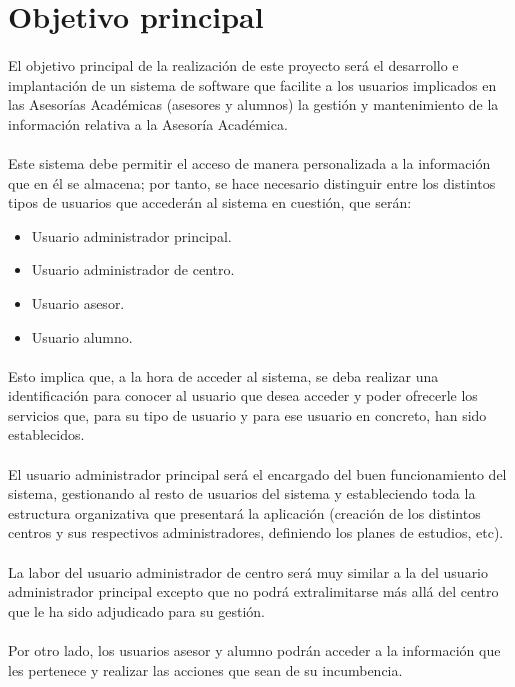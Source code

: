 \section{Objetivo principal}

\paragraph{}El objetivo principal de la realización de este proyecto será el
desarrollo e implantación de un sistema de software que facilite a los usuarios
implicados en las Asesorías Académicas (asesores y alumnos) la gestión y
mantenimiento de la información relativa a la Asesoría Académica.

\paragraph{}Este sistema debe permitir el acceso de manera personalizada a la
información que en él se almacena; por tanto, se hace necesario distinguir entre
los distintos tipos de usuarios que accederán al sistema en cuestión, que serán:

\begin{itemize}
 \item Usuario administrador principal.
 \item Usuario administrador de centro.
 \item Usuario asesor.
 \item Usuario alumno.
\end{itemize}

\paragraph{}Esto implica que, a la hora de acceder al sistema, se deba realizar
una identificación para conocer al usuario que desea acceder y poder ofrecerle
los servicios que, para su tipo de usuario y para ese usuario en concreto, han
sido establecidos.

\paragraph{}El usuario administrador principal será el encargado del buen
funcionamiento del sistema, gestionando al resto de usuarios del sistema y
estableciendo toda la estructura organizativa que presentará la aplicación
(creación de los distintos centros y sus respectivos administradores, definiendo
los planes de estudios, etc).

\paragraph{}La labor del usuario administrador de centro será muy similar a la
del usuario administrador principal excepto que no podrá extralimitarse más
allá del centro que le ha sido adjudicado para su gestión.

\paragraph{}Por otro lado, los usuarios asesor y alumno podrán acceder a la
información que les pertenece y realizar las acciones que sean de su
incumbencia.